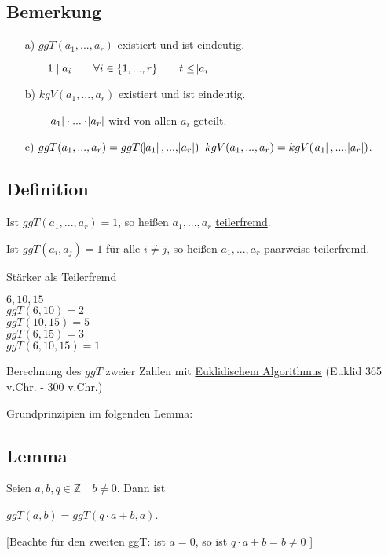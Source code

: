 \documentclass[a4paper, 12pt, twoside] {article}
\begin{document}
\subsection{Bemerkung} %

\begin{itemize}
\item[a)] $ggT(a_1,..., a_r)$ existiert und ist eindeutig.

	$\text{\qquad} 1 \mid a_i \qquad \forall i \in \{1,...,r\} \qquad t \leq \abs{a_i}$
	
\item[b)] $kgV(a_1,..., a_r)$ existiert und ist eindeutig.

	$\text{\qquad} \abs{a_1} \cdot ... \cdot \abs{a_r}$ wird von allen $a_i$ geteilt.
	
\item[c)] $ggT(a_1, ..., a_r) = ggT(\abs{a_1},...,\abs{a_r})$
	$kgV(a_1, ..., a_r) = kgV(\abs{a_1},...,\abs{a_r})$.
	
\end{itemize}

\subsection{Definition} %

Ist $ggT(a_1,...,a_r) = 1$, so heißen $a_1,...,a_r$ \underline{teilerfremd}.

Ist $ggT(a_i, a_j) = 1$	für alle $i \neq j$, so heißen $a_1,...,a_r$ \underline{paarweise} teilerfremd.

Stärker als Teilerfremd

$6,10,15$ \\
$ggT(6,10) = 2$ \\
$ggT(10,15) = 5$ \\
$ggT(6,15) = 3$ \\
$ggT(6,10,15) = 1$


Berechnung des $ggT$ zweier Zahlen mit \underline{Euklidischem Algorithmus} \hfill (Euklid 365 v.Chr. - 300 v.Chr.)

Grundprinzipien im folgenden Lemma:

\subsection{Lemma} %

Seien $a,b,q \in \mathbb{Z} \quad b \neq 0$. Dann ist

$ggT(a,b) = ggT(q \cdot a + b, a)$.

[Beachte für den zweiten ggT: ist $a=0$, so ist $q \cdot a + b = b \neq 0$ ]
\end{document}
